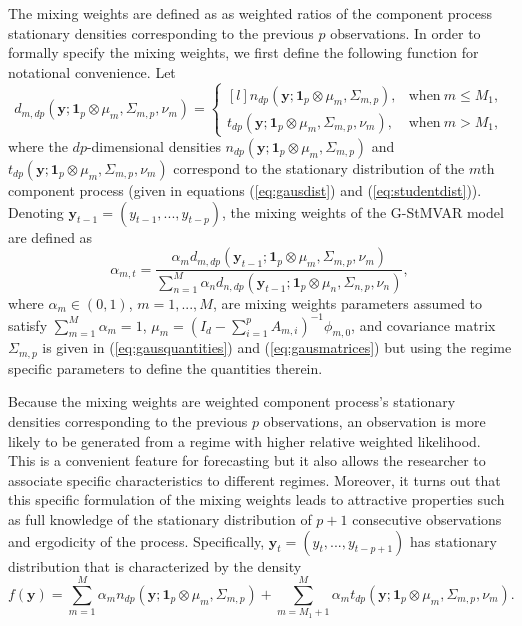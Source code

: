 \documentclass[nojss]{jss}
\begin{document}
The mixing weights are defined as as weighted ratios of the component process stationary densities corresponding to the previous $p$ observations. In order to formally specify the mixing weights,  we first define the following function for notational convenience. Let
\begin{equation}\label{eq:d_mdp}
d_{m,dp}(\boldsymbol{y};\mathbf{1}_p\otimes\mu_m,\Sigma_{m,p},\nu_m)=
\left\{\begin{matrix*}[l]
 n_{dp}(\boldsymbol{y};\mathbf{1}_p\otimes\mu_m,\Sigma_{m,p}), & \text{when} \ m \leq M_1, \\
 t_{dp}(\boldsymbol{y};\mathbf{1}_p\otimes\mu_m,\Sigma_{m,p},\nu_m), & \text{when} \ m > M_1,
\end{matrix*}\right.
\end{equation}
where the $dp$-dimensional densities $n_{dp}(\boldsymbol{y};\mathbf{1}_p\otimes\mu_m,\Sigma_{m,p})$ and $t_{dp}(\boldsymbol{y};\mathbf{1}_p\otimes\mu_m,\Sigma_{m,p},\nu_m)$ correspond to the stationary distribution of the $m$th component process (given in equations (\ref{eq:gausdist}) and (\ref{eq:studentdist})).  Denoting $\boldsymbol{y}_{t-1}=(y_{t-1},...,y_{t-p})$, the mixing weights of the G-StMVAR model are defined as
\begin{equation}\label{eq:alpha_mt}
\alpha_{m,t} = \frac{\alpha_md_{m,dp}(\boldsymbol{y}_{t-1};\mathbf{1}_p\otimes\mu_m,\Sigma_{m,p},\nu_m)}{\sum_{n=1}^M \alpha_n d_{n,dp}(\boldsymbol{y}_{t-1};\mathbf{1}_p\otimes\mu_n,\Sigma_{n,p},\nu_n)},
\end{equation}
where $\alpha_m\in (0,1)$, $m=1,...,M$, are mixing weights parameters assumed to satisfy $\sum_{m=1}^M\alpha_m = 1$,  $\mu_m = (I_d - \sum_{i=1}^pA_{m,i})^{-1}\phi_{m,0}$,  and covariance matrix $\Sigma_{m,p}$ is given in (\ref{eq:gausquantities}) and (\ref{eq:gausmatrices}) but using the regime specific parameters to define the quantities therein.

Because the mixing weights are weighted component process's stationary densities corresponding to the previous $p$ observations,  an observation is more likely to be generated from a regime with higher relative weighted likelihood.  This is a convenient feature for forecasting but it also allows the researcher to associate specific characteristics to different regimes.  Moreover,  it turns out that this specific formulation of the mixing weights leads to attractive properties such as full knowledge of the stationary distribution of $p+1$ consecutive observations and ergodicity of the process. Specifically,  $\boldsymbol{y}_t=(y_t,...,y_{t-p+1})$ has stationary distribution that is characterized by the density \citep[Theorem 2]{Virolainen2:2021}
\begin{equation}
f(\boldsymbol{y}) = \sum_{m=1}^M\alpha_m n_{dp}(\boldsymbol{y};\boldsymbol{1}_p\otimes\mu_{m},\Sigma_{m,p}) + \sum_{m=M_1+1}^M\alpha_mt_{dp}(\boldsymbol{y};\boldsymbol{1}_p\otimes\mu_{m},\Sigma_{m,p},\nu_m).
\end{equation}
\end{document}
